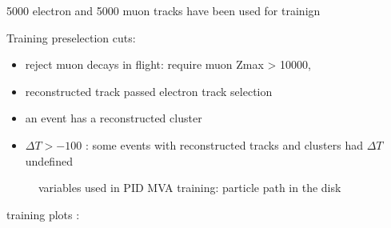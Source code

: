 5000 electron and 5000 muon tracks have been used for trainign

Training preselection cuts:

\begin{itemize}
\item 
  reject muon decays in flight: require muon Zmax > 10000,
\item 
  reconstructed track passed electron track selection
\item 
  an event has a reconstructed cluster 
\item 
  $\Delta T > -100$ : some events with reconstructed tracks and clusters had $\Delta T$ undefined
\end{itemize}

\begin{figure}
  \label{fig:pid_training_2}
  \caption{
    variables used in PID MVA training: particle path in the disk
  }
\end{figure}


training plots :

